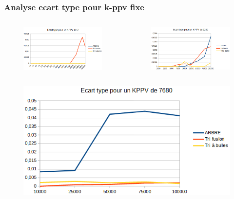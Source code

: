 \documentclass{beamer}
\begin{document}
\begin{frame}
\frametitle{Analyse ecart type pour k-ppv fixe}
\begin{columns}
    \begin{figure}
      \includegraphics[width=\textwidth]{Beamer/ET_KPPV_2.png}
    \end{figure}

    \begin{figure}
      \includegraphics[width=\textwidth]{Beamer/ET_KPPV_1280.png}
    \end{figure}
\end{columns}

  \begin{columns}
    \begin{figure}
      \includegraphics[width=\textwidth]{Beamer/ET_KPPV_7680.png}
    \end{figure}


\end{columns}
\end{frame}
\end{document}
